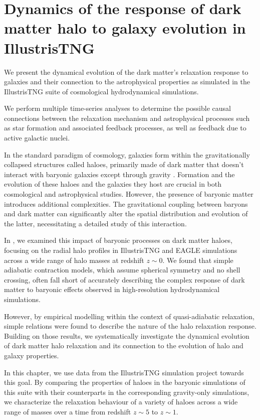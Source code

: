 \chapter{Dynamics of the response of dark matter halo to galaxy evolution in IllustrisTNG}
\label{chap:dynam-relxn}

We present the dynamical evolution of the dark matter's relaxation response to galaxies and their connection to the astrophysical properties as simulated in the IllustrisTNG suite of cosmological hydrodynamical simulations.

We perform multiple time-series analyses to determine the possible causal connections between the relaxation mechanism and astrophysical processes such as star formation and associated feedback processes, as well as feedback due to active galactic nuclei.

In the standard paradigm of cosmology, galaxies form within the gravitationally collapsed structures called haloes, primarily made of dark matter that doesn't interact with baryonic galaxies except through gravity \citep[][]{wr78}. Formation and the evolution of these haloes and the galaxies they host are crucial in both cosmological and astrophysical studies. However, the presence of baryonic matter introduces additional complexities. The gravitational coupling between baryons and dark matter can significantly alter the spatial distribution and evolution of the latter, necessitating a detailed study of this interaction. 

In , we examined this impact of baryonic processes on dark matter haloes, focusing on the radial halo profiles in IllustrisTNG and EAGLE simulations across a wide range of halo masses at redshift $z \sim 0$. We found that simple adiabatic contraction models, which assume spherical symmetry and no shell crossing, often fall short of accurately describing the complex response of dark matter to baryonic effects observed in high-resolution hydrodynamical simulations.

However, by empirical modelling within the context of quasi-adiabatic relaxation, simple relations were found to describe the nature of the halo relaxation response. Building on those results, we systematically investigate the dynamical evolution of dark matter halo relaxation and its connection to the evolution of halo and galaxy properties. 

In this chapter, we use data from the IllustrisTNG simulation project towards this goal. By comparing the properties of haloes in the baryonic simulations of this suite with their counterparts in the corresponding gravity-only simulations, we characterize the relaxation behaviour of a variety of haloes across a wide range of masses over a time from redshift $z \sim 5$ to $z \sim 1$.

